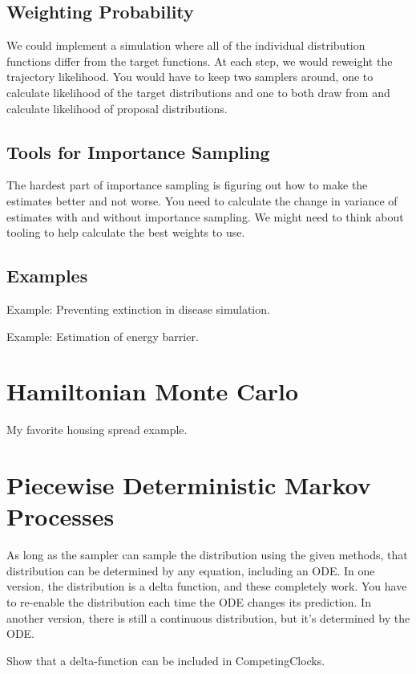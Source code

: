 \documentclass{article}
\begin{document}
\subsection{Weighting Probability}

We could implement a simulation where all of the individual distribution functions differ from the target functions. At each step, we would reweight the trajectory likelihood. You would have to keep two samplers around, one to calculate likelihood of the target distributions and one to both draw from and calculate likelihood of proposal distributions.

\subsection{Tools for Importance Sampling}

The hardest part of importance sampling is figuring out how to make the estimates better and not worse. You need to calculate the change in variance of estimates with and without importance sampling. We might need to think about tooling to help calculate the best weights to use.


\subsection{Examples}
Example: Preventing extinction in disease simulation.

Example: Estimation of energy barrier.


\section{Hamiltonian Monte Carlo}

My favorite housing spread example.


\section{Piecewise Deterministic Markov Processes}

As long as the sampler can sample the distribution using the given methods, that distribution can be determined by any equation, including an ODE. In one version, the distribution is a delta function, and these completely work. You have to re-enable the distribution each time the ODE changes its prediction. In another version, there is still a continuous distribution, but it's determined by the ODE.

Show that a delta-function can be included in CompetingClocks.
\end{document}

